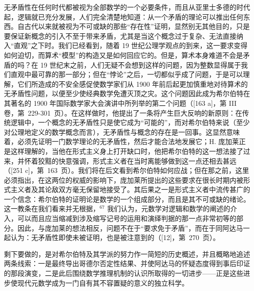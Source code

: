 无矛盾性在任何时代都被视为全部数学的一个必要条件，而且从亚里士多德的时代起，逻辑就已充分发展，人们完全清楚地知道：从一个矛盾的理论可以推出任何东西。自古代以来就被视为不可或缺的那些“存在性”证明，显然别无其他目的，只是要保证新概念的引入不至于带来矛盾，尤其是当这个概念过于复杂、无法直接纳入“直观”之下时。我们已经看到，随着 19 世纪公理学观点的到来，这一要求变得如何迫切，而算术“模型”的构造又是如何回应它的。但是，算术本身难道不会是矛盾的吗？在 19 世纪末之前，人们无疑不会想到这样的问题，因为整数显得属于我们直观中最可靠的那一部分；但在“悖论”之后，一切都似乎成了问题，于是可以理解，它们所造成的不安全感促使数学家们从 1900 年前后起更加慎重地对待算术的无矛盾性问题，以便至少使经典数学免遭灭顶之灾。这个问题因此成为希尔伯特在其著名的 1900 年国际数学家大会演讲中所列举的第二个问题（{[}163 a{]}，第 III 卷，第~229-301~页）。在这样做时，他提出了一条将产生巨大反响的新原则：在传统逻辑中，一个概念的无矛盾性只是使它成为“可能的”，而对希尔伯特来说（至少对公理地定义的数学概念而言），无矛盾性与概念的存在是一回事。这显然意味着，必须先证明一门数学理论的无矛盾性，然后才能合法地发展它；H. 庞加莱正是这样理解的，当他在形式主义身上打开缺口时，他把希尔伯特的这一想法接了过来，并怀着狡黠的快意强调，形式主义者在当时离能够做到这一点还相去甚远（{[}251 c{]}，第~163~页）。我们将在后文看到希尔伯特如何应战；但在那之前，这里必须指出，在这两位的权威的影响下，庞加莱所提出的这些要求在很长时期内被形式主义者及其论敌双方毫无保留地接受了。其后果之一是形式主义者中流传甚广的一个信念：希尔伯特的证明论是数学的一个组成部分，而且是其不可或缺的绪论。这一教条在我们看来并无根据，\(^{67}\) 我们认为，元数学对逻辑和数学的阐述的介入，可以而且应当缩减到涉及缩写记号的运用和演绎判据的那一点非常初等的部分。因此，与庞加莱的想法相反，问题不在于“要求免于矛盾”，而在于同阿达马一起认为：无矛盾性即使未被证明，也是被注意到的（{[}12{]}，第~270~页）。

剩下要做的，是对希尔伯特及其学派的努力作一简短的历史概述，并且概略地追述两条线索：一是最终导出哥德尔否定性结果、并使阿达马的怀疑态度得到事后印证的那段演变，二是此后围绕数学推理机制的认识所取得的一切进步——正是这些进步使现代元数学成为一门自有其不容置疑的意义的独立科学。

